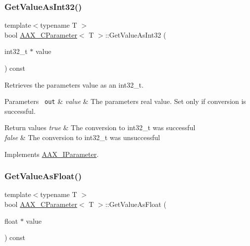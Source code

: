 \mbox{\label{a01537_af9018dbc8c282fec893a6aa240c3a631}} 
\subsubsection{\texorpdfstring{GetValueAsInt32()}{GetValueAsInt32()}}
{\footnotesize\ttfamily template$<$typename T $>$ \\
bool \mbox{\hyperlink{a01537}{A\+A\+X\+\_\+\+C\+Parameter}}$<$ T $>$\+::Get\+Value\+As\+Int32 (\begin{DoxyParamCaption}\item[{int32\+\_\+t $\ast$}]{value }\end{DoxyParamCaption}) const\hspace{0.3cm}{\ttfamily [virtual]}}



Retrieves the parameter\textquotesingle{}s value as an int32\+\_\+t. 


\begin{DoxyParams}[1]{Parameters}
\mbox{\texttt{ out}}  & {\em value} & The parameter\textquotesingle{}s real value. Set only if conversion is successful.\\
\hline
\end{DoxyParams}

\begin{DoxyRetVals}{Return values}
{\em true} & The conversion to int32\+\_\+t was successful \\
\hline
{\em false} & The conversion to int32\+\_\+t was unsuccessful \\
\hline
\end{DoxyRetVals}


Implements \mbox{\hyperlink{a01857_a2a7d538cbb30de98c5d55acdddbec05f}{A\+A\+X\+\_\+\+I\+Parameter}}.

\mbox{\label{a01537_a468c96e334e4155490fca7369f7ad323}} 
\subsubsection{\texorpdfstring{GetValueAsFloat()}{GetValueAsFloat()}}
{\footnotesize\ttfamily template$<$typename T $>$ \\
bool \mbox{\hyperlink{a01537}{A\+A\+X\+\_\+\+C\+Parameter}}$<$ T $>$\+::Get\+Value\+As\+Float (\begin{DoxyParamCaption}\item[{float $\ast$}]{value }\end{DoxyParamCaption}) const\hspace{0.3cm}{\ttfamily [virtual]}}



